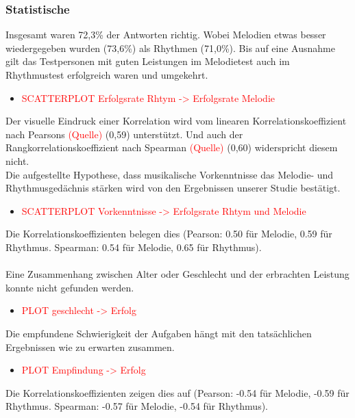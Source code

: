 \documentclass{acm_proc_article-sp}
\begin{document}
\subsubsection{Statistische}
Insgesamt waren 72,3\% der Antworten richtig. Wobei Melodien etwas besser wiedergegeben wurden (73,6\%) als Rhythmen (71,0\%). Bis auf eine Ausnahme gilt das Testpersonen mit guten Leistungen im Melodietest auch im Rhythmustest erfolgreich waren und umgekehrt.
\begin{itemize} 
\item \textcolor{red}{SCATTERPLOT Erfolgsrate Rhtym -> Erfolgsrate Melodie}
\end{itemize}
Der visuelle Eindruck einer Korrelation wird vom linearen Korrelationskoeffizient nach Pearsons \textcolor{red}{(Quelle)} (0,59) unterstützt. Und auch der Rangkorrelationskoeffizient nach Spearman \textcolor{red}{(Quelle)} (0,60) widerspricht diesem nicht.\\

Die aufgestellte Hypothese, dass musikalische Vorkenntnisse das Melodie- und Rhythmusgedächnis stärken wird von den Ergebnissen unserer Studie bestätigt.
\begin{itemize} 
\item \textcolor{red}{SCATTERPLOT Vorkenntnisse -> Erfolgsrate Rhtym und Melodie}
\end{itemize}
Die Korrelationskoeffizienten belegen dies (Pearson: 0.50 für Melodie, 0.59 für Rhythmus. Spearman: 0.54 für Melodie, 0.65 für Rhythmus).\\\\

Eine Zusammenhang zwischen Alter oder Geschlecht und der erbrachten Leistung konnte nicht gefunden werden.
\begin{itemize} 
\item \textcolor{red}{PLOT geschlecht -> Erfolg}
\end{itemize}

Die empfundene Schwierigkeit der Aufgaben hängt mit den tatsächlichen Ergebnissen wie zu erwarten zusammen.
\begin{itemize} 
\item \textcolor{red}{PLOT Empfindung -> Erfolg}
\end{itemize}
Die Korrelationskoeffizienten zeigen dies auf (Pearson: -0.54 für Melodie, -0.59 für Rhythmus. Spearman: -0.57 für Melodie, -0.54 für Rhythmus).
\end{document}
